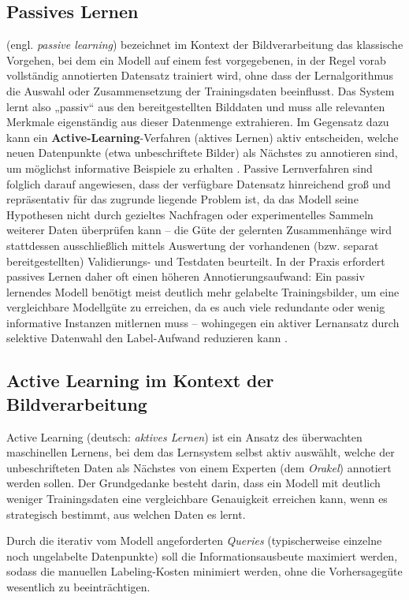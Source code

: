 \documentclass{article}
\begin{document}
\subsection{Passives Lernen} (engl. \emph{passive learning}) bezeichnet im Kontext der Bildverarbeitung das klassische Vorgehen, bei dem ein Modell auf einem fest vorgegebenen, in der Regel vorab vollständig annotierten Datensatz trainiert wird, ohne dass der Lernalgorithmus die Auswahl oder Zusammensetzung der Trainingsdaten beeinflusst. Das System lernt also „passiv“ aus den bereitgestellten Bilddaten und muss alle relevanten Merkmale eigenständig aus dieser Datenmenge extrahieren. Im Gegensatz dazu kann ein \textbf{Active-Learning}-Verfahren (aktives Lernen) aktiv entscheiden, welche neuen Datenpunkte (etwa unbeschriftete Bilder) als Nächstes zu annotieren sind, um möglichst informative Beispiele zu erhalten \cite{Fischer1999}. Passive Lernverfahren sind folglich darauf angewiesen, dass der verfügbare Datensatz hinreichend groß und repräsentativ für das zugrunde liegende Problem ist, da das Modell seine Hypothesen nicht durch gezieltes Nachfragen oder experimentelles Sammeln weiterer Daten überprüfen kann – die Güte der gelernten Zusammenhänge wird stattdessen ausschließlich mittels Auswertung der vorhandenen (bzw. separat bereitgestellten) Validierungs- und Testdaten beurteilt. In der Praxis erfordert passives Lernen daher oft einen höheren Annotierungsaufwand: Ein passiv lernendes Modell benötigt meist deutlich mehr gelabelte Trainingsbilder, um eine vergleichbare Modellgüte zu erreichen, da es auch viele redundante oder wenig informative Instanzen mitlernen muss – wohingegen ein aktiver Lernansatz durch selektive Datenwahl den Label-Aufwand reduzieren kann \cite{Tharwat2023}.

\subsection{Active Learning im Kontext der Bildverarbeitung}

Active Learning (deutsch: \emph{aktives Lernen}) ist ein Ansatz des überwachten maschinellen Lernens, bei dem das Lernsystem selbst aktiv auswählt, welche der unbeschrifteten Daten als Nächstes von einem Experten (dem \emph{Orakel}) annotiert werden sollen. Der Grundgedanke besteht darin, dass ein Modell mit deutlich weniger Trainingsdaten eine vergleichbare Genauigkeit erreichen kann, wenn es strategisch bestimmt, aus welchen Daten es lernt. 

Durch die iterativ vom Modell angeforderten \emph{Queries} (typischerweise einzelne noch ungelabelte Datenpunkte) soll die Informationsausbeute maximiert werden, sodass die manuellen Labeling-Kosten minimiert werden, ohne die Vorhersagegüte wesentlich zu beeinträchtigen. 
\end{document}
